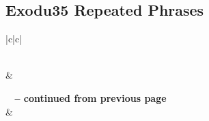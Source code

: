 \subsection{Exodu35 Repeated Phrases}


\normalsize
 
\begin{center}
\begin{longtable}{|c|c|}
\caption[Exodus 35 Repeated Phrases]{Exodus 35 Repeated Phrases}\label{table:Repeated Phrases Exodus 35} \\
\hline {} &  \\ \hline 
\endfirsthead
 
{{\bfseries \tablename\ \thetable{} -- continued from previous page}} \\  
\hline {} &  \\ \hline 
\endhead
 

\end{longtable}
\end{center}
